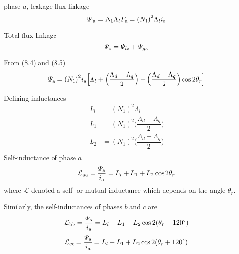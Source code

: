 \documentclass[a4paper,numbers=noenddot,12pt]{scrbook}
\begin{document}
    phase $a$, leakage flux-linkage
    \begin{equation}
        \varPsi_{l\textup{a}} = N_1 \Lambda_l F_{\textup{a}} = {(N_1)}^2 \Lambda_l i_{\textup{a}} 
        \label{eq:Eq8.5}
    \end{equation}

    Total flux-linkage
    \begin{equation}
        \varPsi_{\textup{a}} = \varPsi_{l\textup{a}} + \varPsi_{g\textup{a}}
        \label{eq:Eq8.6}
    \end{equation}

    From (8.4) and (8.5)
    \begin{equation}
        \varPsi_{\textup{a}} = {(N_1)}^2 i_{\textup{a}} \Big[ \Lambda_l + \Big( \dfrac{\Lambda_d + \Lambda_q}{2}\Big) + \Big( \dfrac{\Lambda_d - \Lambda_q}{2}\Big) \cos2\theta_r\Big]
        \label{eq:Eq8.7}
    \end{equation}

    Defining inductances
    \begin{equation}
        \begin{aligned}
            L_l & ={(N_1)}^2 \Lambda_l \\
            L_1 & = {(N_1)}^2 \Big( \dfrac{\Lambda_d + \Lambda_q}{2}\Big) \\
            L_2 & = {(N_1)}^2 \Big( \dfrac{\Lambda_d - \Lambda_q}{2}\Big) \\
        \end{aligned}
        \label{eq:Eq8.8}
    \end{equation}
    Self-inductance of phase $a$
    \begin{equation}
        \mathcal{L}_{\textup{aa}} = \dfrac{\varPsi_{\textup{a}}}{i_{\textup{a}}} = L_l +L_1 +L_2 \cos 2\theta_r
        \label{eq:Eq8.9}
    \end{equation}
    where $\mathcal{L}$ denoted a self- or mutual inductance which depends on the angle $\theta_r$.

    Similarly, the self-inductances of phases $b$ and $c$ are
    \begin{equation}
        \mathcal{L}_{\textup{bb}} = \dfrac{\varPsi_{\textup{a}}}{i_{\textup{a}}} = L_l +L_1 +L_2 \cos 2(\theta_r - 120^{\circ})
        \label{eq:Eq8.10}
    \end{equation}
    \begin{equation}
        \mathcal{L}_{\textup{cc}} = \dfrac{\varPsi_{\textup{a}}}{i_{\textup{a}}} = L_l +L_1 +L_2 \cos 2(\theta_r + 120^{\circ})
        \label{eq:Eq8.11}
    \end{equation}
\end{document}
